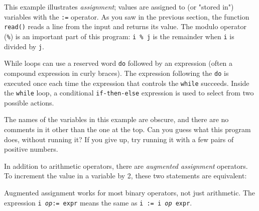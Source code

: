 
This example illustrates \textit{assignment}; values
are assigned to (or "stored in") variables
with the \texttt{:=} operator. As you saw in the previous section, the
function \texttt{read()} reads a line from the input and returns its
value. The modulo operator (\texttt{\%}) is an important part of this
program: \texttt{i \% j} is the remainder when
\texttt{i} is divided by \texttt{j}.

While loops can use a reserved word
\texttt{do} followed by an expression (often a compound expression
in curly braces). The expression following the \texttt{do} is
executed once each time the expression that controls the \texttt{while}
succeeds. Inside the \texttt{while} loop, a
conditional
\texttt{if-then-else} expression is used to select
from two possible actions.

The names of the variables in this example are obscure, and there are no
comments in it other than the one at the top. Can you guess what this
program does, without running it? If you give up, try running it with a
few pairs of positive numbers.

In addition to arithmetic operators, there are \textit{augmented assignment} operators. To
increment the value in a variable by 2, these two statements are
equivalent:


Augmented assignment works for most binary
operators, not just arithmetic. The expression \texttt{i
}\texttt{\textit{op}}\texttt{:= expr} means the same as \texttt{i := i
}\texttt{\textit{op}}\texttt{ expr}.

